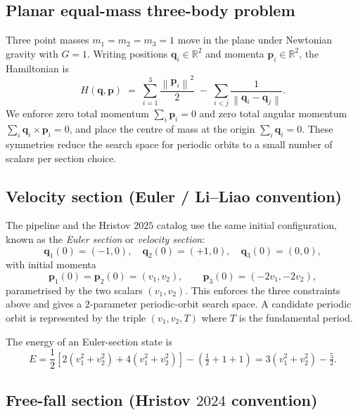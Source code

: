 \documentclass[11pt]{article}
\newcommand{\qvec}{\mathbf{q}}
\newcommand{\pvec}{\mathbf{p}}
\newcommand{\Norm}[1]{\left\lVert#1\right\rVert}
\newcommand{\RR}{\mathbb{R}}
\begin{document}
\subsection{Planar equal-mass three-body problem}

Three point masses $m_1=m_2=m_3=1$ move in the plane under Newtonian
gravity with $G=1$. Writing positions $\qvec_i \in \RR^2$ and momenta
$\pvec_i \in \RR^2$, the Hamiltonian is
\begin{equation}
  H(\qvec, \pvec)
  \;=\;
  \sum_{i=1}^{3} \frac{\Norm{\pvec_i}^2}{2}
  \;-\;
  \sum_{i<j} \frac{1}{\Norm{\qvec_i - \qvec_j}}.
  \label{eq:ham}
\end{equation}
We enforce zero total momentum
$\sum_i \pvec_i = 0$ and zero total angular momentum
$\sum_i \qvec_i \times \pvec_i = 0$, and place the centre of mass at
the origin $\sum_i \qvec_i = 0$. These symmetries reduce the search
space for periodic orbits to a small number of scalars per section
choice.

\subsection{Velocity section (Euler / Li--Liao convention)}

The pipeline and the Hristov $2025$ catalog use the same initial
configuration, known as the \emph{Euler section} or \emph{velocity
section}:
\begin{equation}
  \qvec_1(0) = (-1, 0),\quad
  \qvec_2(0) = (+1, 0),\quad
  \qvec_3(0) = (0, 0),
  \label{eq:euler-q}
\end{equation}
with initial momenta
\begin{equation}
  \pvec_1(0) = \pvec_2(0) = (v_1, v_2),\qquad
  \pvec_3(0) = (-2 v_1, -2 v_2),
  \label{eq:euler-p}
\end{equation}
parametrised by the two scalars $(v_1, v_2)$. This enforces the three
constraints above and gives a $2$-parameter periodic-orbit search
space. A candidate periodic orbit is represented by the triple
$(v_1, v_2, T)$ where $T$ is the fundamental period.

The energy of an Euler-section state is
\begin{equation}
  E = \frac{1}{2}\left[2(v_1^2+v_2^2) + 4(v_1^2+v_2^2)\right]
      - \left(\tfrac{1}{2}+1+1\right) = 3(v_1^2+v_2^2) - \tfrac{5}{2}.
  \label{eq:E-euler}
\end{equation}

\subsection{Free-fall section (Hristov $2024$ convention)}
\end{document}
